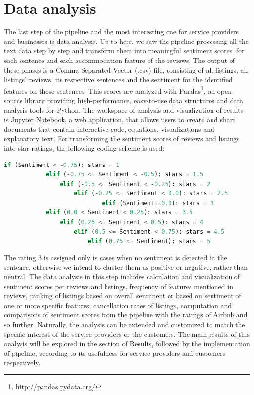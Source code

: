 \section{Data analysis}
% 
%
The last step of the pipeline and the most interesting one for service providers and businesses is data analysis. Up to here, we saw the pipeline processing all the text data step by step and transform them into meaningful sentiment scores, for each sentence and each accommodation feature of the reviews. The output of these phases is a Comma Separated Vector (.csv) file, consisting of all listings, all listings' reviews, its respective sentences and the sentiment for the identified features on these sentences. This scores are analyzed with Pandas\footnote{http://pandas.pydata.org/}, an open source library providing high-performance, easy-to-use data structures and data analysis tools for Python. The workspace  of analysis and visualization of results is Jupyter Notebook, a web application, that allows users to create and share documents that contain  interactive code, equations, visualizations and explanatory text. For transforming the sentiment scores of reviews and listings into star ratings, the following coding scheme is used:

\tiny
\begin{lstlisting}[language=python]
	if (Sentiment < -0.75):	stars = 1
  			elif (-0.75 <= Sentiment < -0.5): stars = 1.5
    			elif (-0.5 <= Sentiment < -0.25): stars = 2
    				elif (-0.25 <= Sentiment < 0.0): stars = 2.5
            				elif (Sentiment==0.0): stars = 3
    		elif (0.0 < Sentiment < 0.25): stars = 3.5
    			elif (0.25 <= Sentiment < 0.5): stars = 4
    				elif (0.5 <= Sentiment < 0.75): stars = 4.5
    					elif (0.75 <= Sentiment): stars = 5
\end{lstlisting}
\normalsize
The rating 3 is assigned only is cases when no sentiment is detected in the sentence, otherwise we intend to cluster them as positive or negative, rather than neutral. The data  analysis in this step includes calculation and visualization of sentiment scores per reviews and listings, frequency of features mentioned in reviews, ranking of listings based on overall sentiment or based on sentiment of one or more specific features, cancellation rates of listings, computation and comparisons of sentiment scores from the pipeline with the ratings of Airbnb and so further. Naturally, the analysis can be extended and customized to match the specific interest of the service providers or the customers. The main results of this analysis will be explored in the section of Results, followed by the implementation of pipeline, according to its usefulness for service providers and customers respectively. 